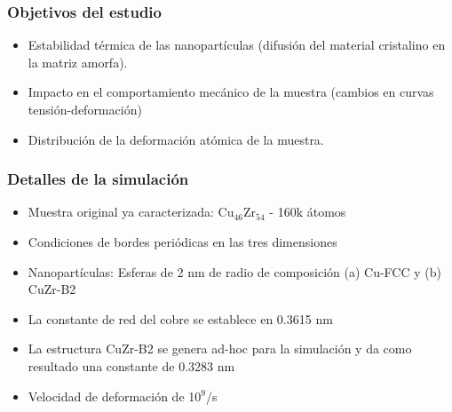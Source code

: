 \begin{frame}
\frametitle{Objetivos del estudio}
\vspace{0.5cm}
 \vspace{0.5cm}
 \begin{itemize}
  \item Estabilidad t\'ermica de las nanopart\'iculas (difusi\'on del material cristalino en la matriz amorfa).
  \vspace{0.5cm}
  \item Impacto en el comportamiento mec\'anico de la muestra (cambios en curvas tensi\'on-deformaci\'on)
  \vspace{0.5cm}
  \item Distribuci\'on de la deformaci\'on at\'omica de la muestra.
 \end{itemize}
\end{frame}

\begin{frame}
 \frametitle{Detalles de la simulaci\'on}
 \vspace{0.3cm}
 \begin{itemize}
  \item Muestra original ya caracterizada: Cu$_{46}$Zr$_{54}$ - 160k \'atomos
  \item Condiciones de bordes peri\'odicas en las tres dimensiones
  \item Nanopart\'iculas: Esferas de 2 nm de radio de composici\'on (a) Cu-FCC y (b) CuZr-B2
  \item La constante de red del cobre se establece en 0.3615 nm
  \item La estructura CuZr-B2 se genera ad-hoc para la simulaci\'on y da como resultado una constante de 0.3283 nm
  \item Velocidad de deformaci\'on de 10$^{9}$/s
 \end{itemize}
\end{frame}

